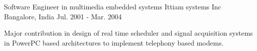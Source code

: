 \begin{cventries}
  \cventry
    {Software Engineer in multimedia embedded  systems } %
    {Ittiam systems Inc} %
    {Bangalore, India} %
    {Jul. 2001 - Mar. 2004} %
    {
      \begin{cvitems} %
       \item {Major contribution in design of real time scheduler and  signal acquisition systems in PowerPC based architectures to implement telephony based modems.}
      \end{cvitems}
    }

\end{cventries}
